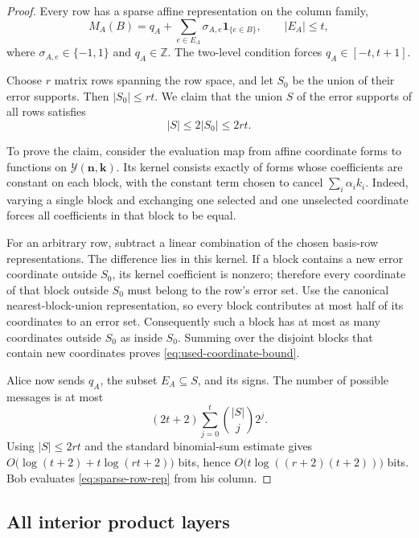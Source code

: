 \documentclass[11pt]{article}
\theoremstyle{definition}
\theoremstyle{remark}
\newcommand{\cY}{\mathcal Y}
\newcommand{\Z}{\mathbb Z}
\newcommand{\1}{\mathbf 1}
\begin{document}
\begin{proof}
Every row has a sparse affine representation on the column family,
\begin{equation}\label{eq:sparse-row-rep}
 M_A(B)=q_A+\sum_{e\in E_A}\sigma_{A,e}\1_{\{e\in B\}},
 \qquad |E_A|\le t,
\end{equation}
where $\sigma_{A,e}\in\{-1,1\}$ and $q_A\in\Z$.  The two-level condition
forces $q_A\in[-t,t+1]$.

Choose $r$ matrix rows spanning the row space, and let $S_0$ be the union of
their error supports.  Then $|S_0|\le rt$.  We claim that the union $S$ of
the error supports of all rows satisfies
\begin{equation}\label{eq:used-coordinate-bound}
 |S|\le2|S_0|\le2rt.
\end{equation}

To prove the claim, consider the evaluation map from affine coordinate forms
to functions on $\cY(\mathbf n,\mathbf k)$.  Its kernel consists exactly of
forms whose coefficients are constant on each block, with the constant term
chosen to cancel $\sum_i\alpha_i k_i$.  Indeed, varying a single block and
exchanging one selected and one unselected coordinate forces all
coefficients in that block to be equal.

For an arbitrary row, subtract a linear combination of the chosen basis-row
representations.  The difference lies in this kernel.  If a block contains a
new error coordinate outside $S_0$, its kernel coefficient is nonzero;
therefore every coordinate of that block outside $S_0$ must belong to the
row's error set.  Use the canonical nearest-block-union representation, so
every block contributes at most half of its coordinates to an error set.
Consequently such a block has at most as many coordinates outside $S_0$ as
inside $S_0$.  Summing over the disjoint blocks that contain new coordinates
proves \eqref{eq:used-coordinate-bound}.

Alice now sends $q_A$, the subset $E_A\subseteq S$, and its signs.  The
number of possible messages is at most
\[
 (2t+2)\sum_{j=0}^t\binom{|S|}{j}2^j.
\]
Using $|S|\le2rt$ and the standard binomial-sum estimate gives
$O\bigl(\log(t+2)+t\log(rt+2)\bigr)$ bits, hence
$O\bigl(t\log((r+2)(t+2))\bigr)$ bits.  Bob evaluates
\eqref{eq:sparse-row-rep} from his column.
\end{proof}

\subsection{All interior product layers}
\end{document}
